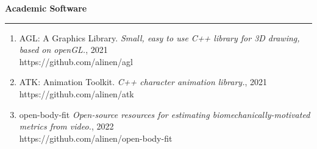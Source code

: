 
{\Large {\bf Academic Software}}
\vspace{0.1cm}
\hrule
\medskip

\begin{enumerate}[leftmargin=*]
\item AGL: A Graphics Library. \textit{Small, easy to use C++ library for 3D drawing, based on openGL.}, 2021 \\
https://github.com/alinen/agl
\item ATK: Animation Toolkit. \textit{C++ character animation library.}, 2021 \\
https://github.com/alinen/atk
\item open-body-fit \textit{Open-source resources for estimating biomechanically-motivated metrics from video.}, 2022 \\
https://github.com/alinen/open-body-fit
\end{enumerate}

